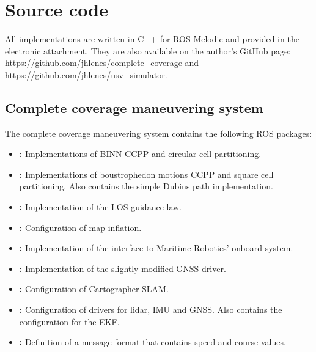 \chapter{Source code}

All implementations are written in C++ for ROS Melodic and provided in the electronic attachment. They are also available on the author's GitHub page: \url{https://github.com/jhlenes/complete_coverage} and \url{https://github.com/jhlenes/usv_simulator}. 

\section{Complete coverage maneuvering system}

The complete coverage maneuvering system contains the following ROS packages:

\begin{itemize}

\item \textbf{:} Implementations of BINN CCPP and circular cell partitioning.

\item \textbf{:} Implementations of boustrophedon motions CCPP and square cell partitioning. Also contains the simple Dubins path implementation.

\item\textbf{:} Implementation of the LOS guidance law.

\item \textbf{:} Configuration of map inflation.

\item \textbf{:} Implementation of the interface to Maritime Robotics' onboard system.

\item\textbf{:} Implementation of the slightly modified GNSS driver.

\item\textbf{:} Configuration of Cartographer SLAM.

\item\textbf{:} Configuration of drivers for lidar, IMU and GNSS. Also contains the configuration for the EKF.

\item\textbf{:} Definition of a message format that contains speed and course values.

\end{itemize}

